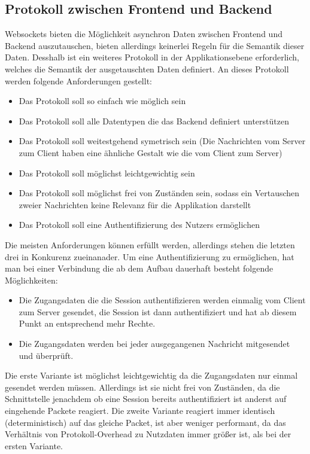 \subsection{Protokoll zwischen Frontend und Backend}
Websockets bieten die Möglichkeit asynchron Daten zwischen Frontend und Backend auszutauschen, 
bieten allerdings keinerlei Regeln für die Semantik dieser Daten. 
Desshalb ist ein weiteres Protokoll in der Applikationsebene erforderlich, 
welches die Semantik der ausgetauschten Daten definiert. 
An dieses Protokoll werden folgende Anforderungen gestellt:
\begin{itemize}
 \item Das Protokoll soll so einfach wie möglich sein
 \item Das Protokoll soll alle Datentypen die das Backend definiert unterstützen
 \item Das Protokoll soll weitestgehend symetrisch sein (Die Nachrichten vom Server zum Client haben eine ähnliche Gestalt wie die vom Client zum Server)
 \item Das Protokoll soll möglichst leichtgewichtig sein
 \item Das Protokoll soll möglichst frei von Zuständen sein, sodass ein Vertauschen zweier Nachrichten keine Relevanz für die Applikation darstellt
 \item Das Protokoll soll eine Authentifizierung des Nutzers ermöglichen
\end{itemize}
Die meisten Anforderungen können erfüllt werden, allerdings stehen die letzten drei in Konkurenz zueinanader.
Um eine Authentifizierung zu ermöglichen, hat man bei einer Verbindung die ab dem Aufbau dauerhaft besteht folgende Möglichkeiten:
\begin{itemize}
  \item Die Zugangsdaten die die Session authentifizieren werden einmalig vom Client zum Server gesendet, 
  die Session ist dann authentifiziert und hat ab diesem Punkt an entsprechend mehr Rechte.
  \item Die Zugangsdaten werden bei jeder ausgegangenen Nachricht mitgesendet und überprüft. 
\end{itemize}
Die erste Variante ist möglichst leichtgewichtig da die Zugangsdaten nur einmal gesendet werden müssen. 
Allerdings ist sie nicht frei von Zuständen, da die Schnittstelle jenachdem ob eine Session bereits authentifiziert ist anderst auf eingehende Packete reagiert.
Die zweite Variante reagiert immer identisch (deterministisch) auf das gleiche Packet, 
ist aber weniger performant, da das Verhältnis von Protokoll-Overhead zu Nutzdaten immer größer ist, als bei der ersten Variante.
